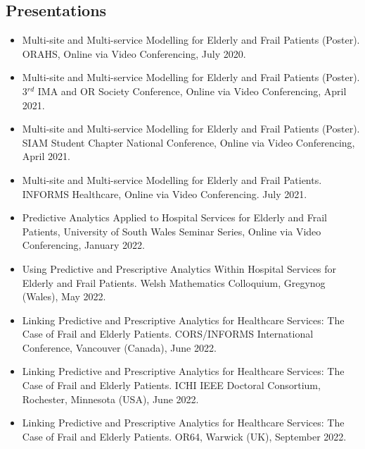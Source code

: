 \documentclass[../thesis.tex]{subfiles}
\begin{document}
\subsection*{Presentations}
\begin{itemize}
    \item Multi-site and Multi-service Modelling for Elderly and Frail Patients (Poster). ORAHS, Online via Video Conferencing, July 2020.
    \item Multi-site and Multi-service Modelling for Elderly and Frail Patients (Poster). 3$^{rd}$ IMA and OR Society Conference, Online via Video Conferencing, April 2021.
    \item Multi-site and Multi-service Modelling for Elderly and Frail Patients (Poster). SIAM Student Chapter National Conference, Online via Video Conferencing, April 2021.
    \item Multi-site and Multi-service Modelling for Elderly and Frail Patients. INFORMS Healthcare, Online via Video Conferencing. July 2021.
    \item Predictive Analytics Applied to Hospital Services for Elderly and Frail Patients, University of South Wales Seminar Series, Online via Video Conferencing, January 2022.
    \item Using Predictive and Prescriptive Analytics Within Hospital Services for Elderly and Frail Patients. Welsh Mathematics Colloquium, Gregynog (Wales), May 2022.
    \item Linking Predictive and Prescriptive Analytics for Healthcare Services: The Case of Frail and Elderly Patients. CORS/INFORMS International Conference, Vancouver (Canada), June 2022.
    \item Linking Predictive and Prescriptive Analytics for Healthcare Services: The Case of Frail and Elderly Patients. ICHI IEEE Doctoral Consortium, Rochester, Minnesota (USA), June 2022.
    \item Linking Predictive and Prescriptive Analytics for Healthcare Services: The Case of Frail and Elderly Patients. OR64, Warwick (UK), September 2022.
\end{itemize}
\vfill
\end{document}
